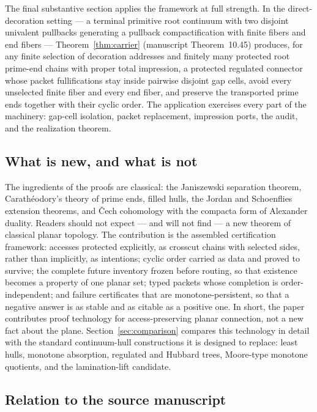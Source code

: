 \documentclass[11pt,reqno]{amsart}
\theoremstyle{definition}
\theoremstyle{remark}
\begin{document}
The final substantive section applies the framework at full strength.  In
the direct-decoration setting --- a terminal primitive root continuum with
two disjoint univalent pullbacks generating a pullback compactification with
finite fibers and end fibers --- Theorem~\ref{thm:carrier} (manuscript
Theorem~10.45) produces, for any finite selection of decoration addresses
and finitely many protected root prime-end chains with proper total
impression, a protected regulated connector whose packet fullifications stay
inside pairwise disjoint gap cells, avoid every unselected finite fiber and
every end fiber, and preserve the transported prime ends together with their
cyclic order.  The application exercises every part of the machinery:
gap-cell isolation, packet replacement, impression ports, the audit, and the
realization theorem.

\subsection{What is new, and what is not}\label{subsec:A-honest}

The ingredients of the proofs are classical: the Janiszewski separation
theorem, Carath\'eodory's theory of prime ends, filled hulls, the Jordan and
Schoenflies extension theorems, and \v{C}ech cohomology with the compacta
form of Alexander duality.  Readers should not expect --- and will not
find --- a new theorem of classical planar topology.  The contribution is
the assembled certification framework: accesses protected explicitly, as
crosscut chains with selected sides, rather than implicitly, as intentions;
cyclic order carried as data and proved to survive; the complete future
inventory frozen before routing, so that existence becomes a property of one
planar set; typed packets whose completion is order-independent; and failure
certificates that are monotone-persistent, so that a negative answer is as
stable and as citable as a positive one.  In short, the paper contributes
proof technology for access-preserving planar connection, not a new fact
about the plane.  Section~\ref{sec:comparison} compares this technology in
detail with the standard continuum-hull constructions it is designed to
replace: least hulls, monotone absorption, regulated and Hubbard trees,
Moore-type monotone quotients, and the lamination-lift candidate.

\subsection{Relation to the source manuscript}\label{subsec:A-source}
\end{document}
